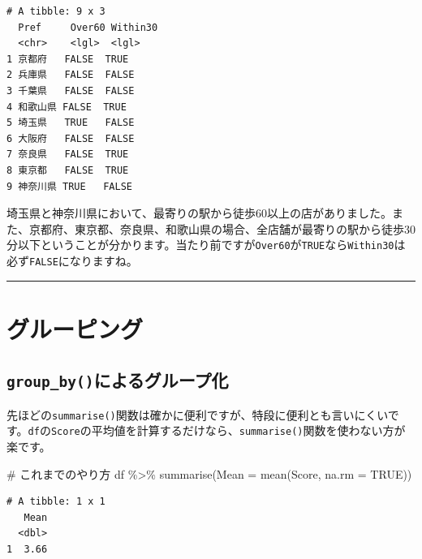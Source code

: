 \documentclass[
  a4paper,
  pandoc,
  ja=standard,
  jafont=haranoaji]{bxjsbook}
\newenvironment{Shaded}{\begin{snugshade}}{\end{snugshade}}
\newcommand{\AttributeTok}[1]{\textcolor[rgb]{0.00,0.48,0.65}{#1}}
\newcommand{\CommentTok}[1]{\textcolor[rgb]{0.37,0.37,0.37}{#1}}
\newcommand{\ConstantTok}[1]{\textcolor[rgb]{0.56,0.35,0.01}{#1}}
\newcommand{\FunctionTok}[1]{\textcolor[rgb]{0.28,0.35,0.67}{#1}}
\newcommand{\NormalTok}[1]{\textcolor[rgb]{0.00,0.48,0.65}{#1}}
\newcommand{\SpecialCharTok}[1]{\textcolor[rgb]{0.37,0.37,0.37}{#1}}
\begin{document}
\begin{verbatim}
# A tibble: 9 x 3
  Pref     Over60 Within30
  <chr>    <lgl>  <lgl>   
1 京都府   FALSE  TRUE    
2 兵庫県   FALSE  FALSE   
3 千葉県   FALSE  FALSE   
4 和歌山県 FALSE  TRUE    
5 埼玉県   TRUE   FALSE   
6 大阪府   FALSE  FALSE   
7 奈良県   FALSE  TRUE    
8 東京都   FALSE  TRUE    
9 神奈川県 TRUE   FALSE   
\end{verbatim}

埼玉県と神奈川県において、最寄りの駅から徒歩60以上の店がありました。また、京都府、東京都、奈良県、和歌山県の場合、全店舗が最寄りの駅から徒歩30分以下ということが分かります。当たり前ですが\texttt{Over60}が\texttt{TRUE}なら\texttt{Within30}は必ず\texttt{FALSE}になりますね。

\begin{center}\rule{0.5\linewidth}{0.5pt}\end{center}

\hypertarget{sec-handling2_group}{%
\section{グルーピング}\label{sec-handling2_group}}

\hypertarget{group_byux306bux3088ux308bux30b0ux30ebux30fcux30d7ux5316}{%
\subsection{\texorpdfstring{\texttt{group\_by()}によるグループ化}{group\_by()によるグループ化}}\label{group_byux306bux3088ux308bux30b0ux30ebux30fcux30d7ux5316}}

先ほどの\texttt{summarise()}関数は確かに便利ですが、特段に便利とも言いにくいです。\texttt{df}の\texttt{Score}の平均値を計算するだけなら、\texttt{summarise()}関数を使わない方が楽です。

\begin{Shaded}
\begin{Highlighting}[numbers=left,,]
\CommentTok{\# これまでのやり方}
\NormalTok{df }\SpecialCharTok{\%\textgreater{}\%}
  \FunctionTok{summarise}\NormalTok{(}\AttributeTok{Mean =} \FunctionTok{mean}\NormalTok{(Score, }\AttributeTok{na.rm =} \ConstantTok{TRUE}\NormalTok{))}
\end{Highlighting}
\end{Shaded}

\begin{verbatim}
# A tibble: 1 x 1
   Mean
  <dbl>
1  3.66
\end{verbatim}
\end{document}
